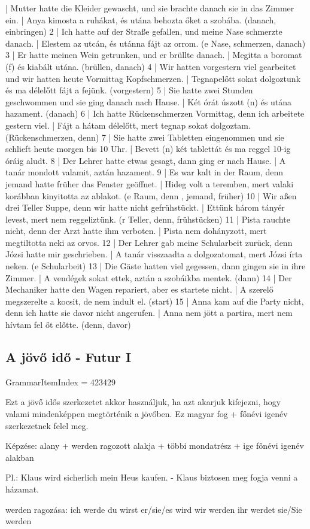 \documentclass{article}
\newenvironment{desc}{\verbatim}{\endverbatim}
\newenvironment{exmp}{\verbatim}{\endverbatim}
\begin{document}
\begin{exmp}
1 | Mutter hatte die Kleider gewascht, und sie brachte danach sie in das Zimmer ein. | Anya kimosta a ruhákat, és utána behozta őket a szobába. (danach, einbringen)
2 | Ich hatte auf der Straße gefallen, und meine Nase schmerzte danach. | Elestem az utcán, és utánna fájt az orrom. (e Nase, schmerzen, danach)
3 | Er hatte meinen Wein getrunken, und er brüllte danach. | Megitta a boromat (f) és kiabált utána. (brüllen, danach)
4 | Wir hatten vorgestern viel gearbeitet und wir hatten heute Vormittag Kopfschmerzen. | Tegnapelőtt sokat dolgoztunk és ma délelőtt fájt a fejünk. (vorgestern)
5 | Sie hatte zwei Stunden geschwommen und sie ging danach nach Hause. | Két órát úszott (n) és utána hazament. (danach)
6 | Ich hatte Rückenschmerzen Vormittag, denn ich arbeitete gestern viel. | Fájt a hátam délelőtt, mert tegnap sokat dolgoztam. (Rückenschmerzen, denn)
7 | Sie hatte zwei Tabletten eingenommen und sie schlieft heute morgen bis 10 Uhr. | Bevett (n) két tablettát és ma reggel 10-ig óráig aludt.
8 | Der Lehrer hatte etwas gesagt, dann ging er nach Hause. | A tanár mondott valamit, aztán hazament.
9 | Es war kalt in der Raum, denn jemand hatte früher das Fenster geöffnet. | Hideg volt a teremben, mert valaki korábban kinyitotta az ablakot. (e Raum, denn , jemand, früher)
10 | Wir aßen drei Teller Suppe, denn wir hatte nicht gefrühstückt. | Ettünk három tányér levest, mert nem reggeliztünk. (r Teller, denn, frühstücken)
11 | Pista rauchte nicht, denn der Arzt hatte ihm verboten. | Pista nem dohányzott, mert megtiltotta neki az orvos.
12 | Der Lehrer gab meine Schularbeit zurück, denn Józsi hatte mir geschrieben. | A tanár visszaadta a dolgozatomat, mert Józsi írta neken. (e Schularbeit)
13 | Die Gäste hatten viel gegessen, dann gingen sie in ihre Zimmer. | A vendégek sokat ettek, aztán a szobáikba mentek. (dann)
14 | Der Mechaniker hatte den Wagen repariert, aber es startete nicht. | A szerelő megszerelte a kocsit, de nem indult el. (start)
15 | Anna kam auf die Party nicht, denn ich hatte sie davor nicht angerufen. | Anna nem jött a partira, mert nem hívtam fel őt előtte. (denn, davor)
\end{exmp}

\subsection{A jövő idő - Futur I}

GrammarItemIndex = 423429

\begin{desc}
Ezt a jövő idős szerkezetet akkor használjuk, ha azt akarjuk kifejezni, hogy valami mindenképpen megtörténik a jövőben. Ez magyar fog + főnévi igenév szerkezetnek felel meg.

Képzése: alany + werden ragozott alakja + többi mondatrész + ige főnévi igenév alakban

Pl.: Klaus wird sicherlich mein Heus kaufen. - Klaus biztosen meg fogja venni a házamat.

werden ragozása:
ich werde
du wirst
er/sie/es wird
wir werden
ihr werdet
sie/Sie werden
\end{desc}
\end{document}
